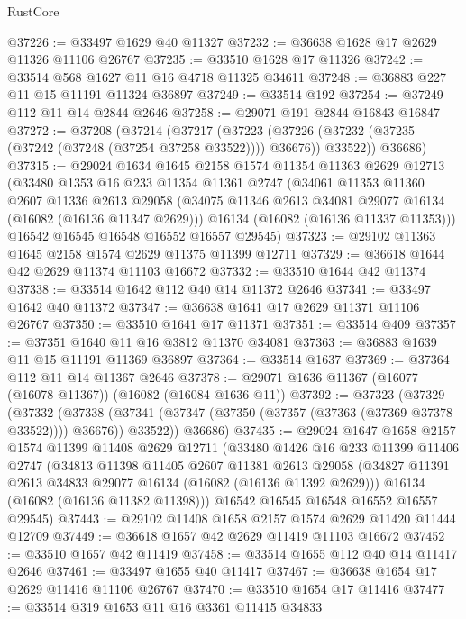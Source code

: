 \begin{lexlean}{RustCore}
\begin{coremodule}
@37226 := @33497 @1629 @40 @11327
@37232 := @36638 @1628 @17 @2629 @11326 @11106 @26767
@37235 := @33510 @1628 @17 @11326
@37242 := @33514 @568 @1627 @11 @16 @4718 @11325 @34611
@37248 := @36883 @227 @11 @15 @11191 @11324 @36897
@37249 := @33514 @192
@37254 := @37249 @112 @11 @14 @2844 @2646
@37258 := @29071 @191 @2844 @16843 @16847
@37272 := @37208
    (@37214
      (@37217
        (@37223 (@37226 (@37232 (@37235 (@37242 (@37248 (@37254 @37258 @33522)))) @36676)) @33522))
      @36686)
@37315 := @29024
    @1634
    @1645
    @2158
    @1574
    @11354
    @11363
    @2629
    @12713
    (@33480
      @1353
      @16
      @233
      @11354
      @11361
      @2747
      (@34061
        @11353
        @11360
        @2607
        @11336
        @2613
        @29058
        (@34075 @11346 @2613 @34081 @29077 @16134 (@16082 (@16136 @11347 @2629)))
        @16134
        (@16082 (@16136 @11337 @11353)))
      @16542
      @16545
      @16548
      @16552
      @16557
      @29545)
@37323 := @29102 @11363 @1645 @2158 @1574 @2629 @11375 @11399 @12711
@37329 := @36618 @1644 @42 @2629 @11374 @11103 @16672
@37332 := @33510 @1644 @42 @11374
@37338 := @33514 @1642 @112 @40 @14 @11372 @2646
@37341 := @33497 @1642 @40 @11372
@37347 := @36638 @1641 @17 @2629 @11371 @11106 @26767
@37350 := @33510 @1641 @17 @11371
@37351 := @33514 @409
@37357 := @37351 @1640 @11 @16 @3812 @11370 @34081
@37363 := @36883 @1639 @11 @15 @11191 @11369 @36897
@37364 := @33514 @1637
@37369 := @37364 @112 @11 @14 @11367 @2646
@37378 := @29071 @1636 @11367 (@16077 (@16078 @11367)) (@16082 (@16084 @1636 @11))
@37392 := @37323
    (@37329
      (@37332
        (@37338 (@37341 (@37347 (@37350 (@37357 (@37363 (@37369 @37378 @33522)))) @36676)) @33522))
      @36686)
@37435 := @29024
    @1647
    @1658
    @2157
    @1574
    @11399
    @11408
    @2629
    @12711
    (@33480
      @1426
      @16
      @233
      @11399
      @11406
      @2747
      (@34813
        @11398
        @11405
        @2607
        @11381
        @2613
        @29058
        (@34827 @11391 @2613 @34833 @29077 @16134 (@16082 (@16136 @11392 @2629)))
        @16134
        (@16082 (@16136 @11382 @11398)))
      @16542
      @16545
      @16548
      @16552
      @16557
      @29545)
@37443 := @29102 @11408 @1658 @2157 @1574 @2629 @11420 @11444 @12709
@37449 := @36618 @1657 @42 @2629 @11419 @11103 @16672
@37452 := @33510 @1657 @42 @11419
@37458 := @33514 @1655 @112 @40 @14 @11417 @2646
@37461 := @33497 @1655 @40 @11417
@37467 := @36638 @1654 @17 @2629 @11416 @11106 @26767
@37470 := @33510 @1654 @17 @11416
@37477 := @33514 @319 @1653 @11 @16 @3361 @11415 @34833

\end{coremodule}
\end{lexlean}

